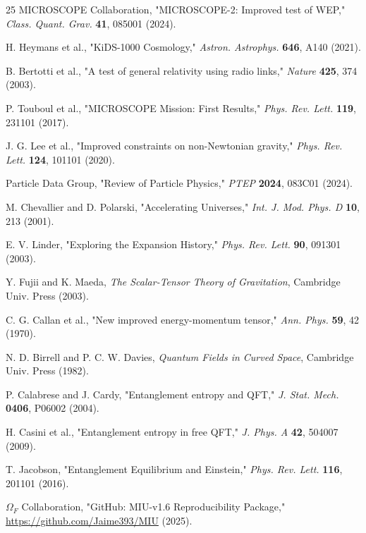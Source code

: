 \documentclass[12pt, a4paper]{article}
\theoremstyle{miuThm}
\theoremstyle{remark}
\begin{document}
\begin{thebibliography}{25}
MICROSCOPE Collaboration, "MICROSCOPE-2: Improved test of WEP," 
\textit{Class. Quant. Grav.} \textbf{41}, 085001 (2024).

H. Heymans et al., "KiDS-1000 Cosmology," \textit{Astron. Astrophys.} 
\textbf{646}, A140 (2021).

B. Bertotti et al., "A test of general relativity using radio links," 
\textit{Nature} \textbf{425}, 374 (2003).

P. Touboul et al., "MICROSCOPE Mission: First Results," 
\textit{Phys. Rev. Lett.} \textbf{119}, 231101 (2017).

J. G. Lee et al., "Improved constraints on non-Newtonian gravity," 
\textit{Phys. Rev. Lett.} \textbf{124}, 101101 (2020).

Particle Data Group, "Review of Particle Physics," \textit{PTEP} 
\textbf{2024}, 083C01 (2024).

M. Chevallier and D. Polarski, "Accelerating Universes," 
\textit{Int. J. Mod. Phys. D} \textbf{10}, 213 (2001).

E. V. Linder, "Exploring the Expansion History," 
\textit{Phys. Rev. Lett.} \textbf{90}, 091301 (2003).

Y. Fujii and K. Maeda, \textit{The Scalar-Tensor Theory of Gravitation}, 
Cambridge Univ. Press (2003).

C. G. Callan et al., "New improved energy-momentum tensor," 
\textit{Ann. Phys.} \textbf{59}, 42 (1970).

N. D. Birrell and P. C. W. Davies, \textit{Quantum Fields in Curved Space}, 
Cambridge Univ. Press (1982).

P. Calabrese and J. Cardy, "Entanglement entropy and QFT," 
\textit{J. Stat. Mech.} \textbf{0406}, P06002 (2004).

H. Casini et al., "Entanglement entropy in free QFT," 
\textit{J. Phys. A} \textbf{42}, 504007 (2009).

T. Jacobson, "Entanglement Equilibrium and Einstein," 
\textit{Phys. Rev. Lett.} \textbf{116}, 201101 (2016).

$\Omega_F$ Collaboration, "GitHub: MIU-v1.6 Reproducibility Package," 
\url{https://github.com/Jaime393/MIU} (2025).
\end{thebibliography}
\newpage
\end{document}

